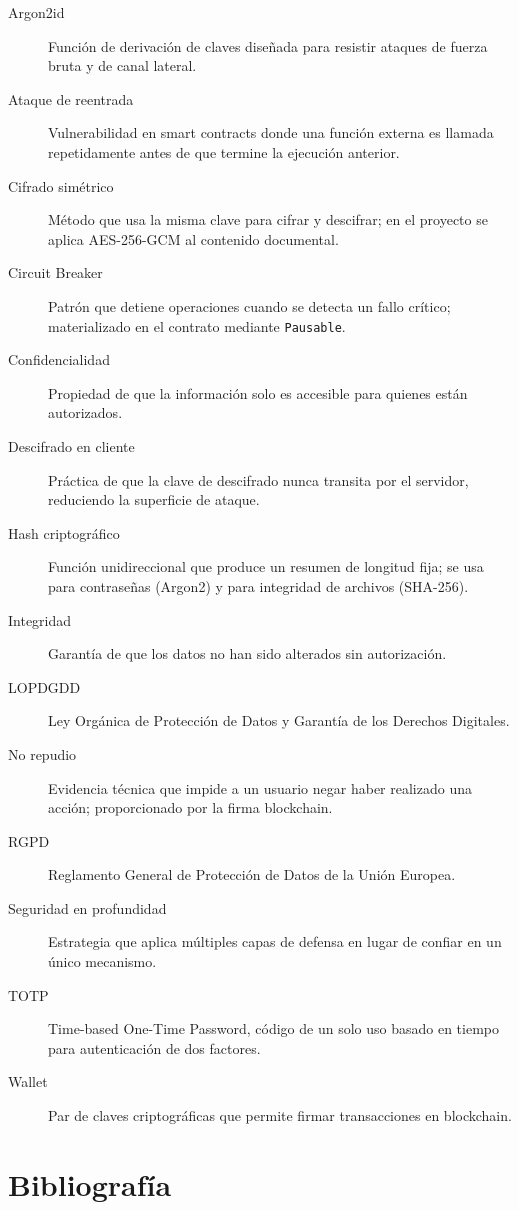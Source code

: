 \documentclass[11pt, a4paper]{article}
\begin{document}
\begin{description}
    \item[Argon2id] Funci\'on de derivaci\'on de claves dise\~nada para resistir ataques de fuerza bruta y de canal lateral.
    \item[Ataque de reentrada] Vulnerabilidad en smart contracts donde una funci\'on externa es llamada repetidamente antes de que termine la ejecuci\'on anterior.
    \item[Cifrado sim\'etrico] M\'etodo que usa la misma clave para cifrar y descifrar; en el proyecto se aplica AES-256-GCM al contenido documental.
    \item[Circuit Breaker] Patr\'on que detiene operaciones cuando se detecta un fallo cr\'itico; materializado en el contrato mediante \texttt{Pausable}.
    \item[Confidencialidad] Propiedad de que la informaci\'on solo es accesible para quienes est\'an autorizados.
    \item[Descifrado en cliente] Pr\'actica de que la clave de descifrado nunca transita por el servidor, reduciendo la superficie de ataque.
    \item[Hash criptogr\'afico] Funci\'on unidireccional que produce un resumen de longitud fija; se usa para contrase\~nas (Argon2) y para integridad de archivos (SHA-256).
    \item[Integridad] Garant\'ia de que los datos no han sido alterados sin autorizaci\'on.
    \item[LOPDGDD] Ley Org\'anica de Protecci\'on de Datos y Garant\'ia de los Derechos Digitales.
    \item[No repudio] Evidencia t\'ecnica que impide a un usuario negar haber realizado una acci\'on; proporcionado por la firma blockchain.
    \item[RGPD] Reglamento General de Protecci\'on de Datos de la Uni\'on Europea.
    \item[Seguridad en profundidad] Estrategia que aplica m\'ultiples capas de defensa en lugar de confiar en un \'unico mecanismo.
    \item[TOTP] Time-based One-Time Password, c\'odigo de un solo uso basado en tiempo para autenticaci\'on de dos factores.
    \item[Wallet] Par de claves criptogr\'aficas que permite firmar transacciones en blockchain.
\end{description}

\section*{Bibliografía}
\end{document}
